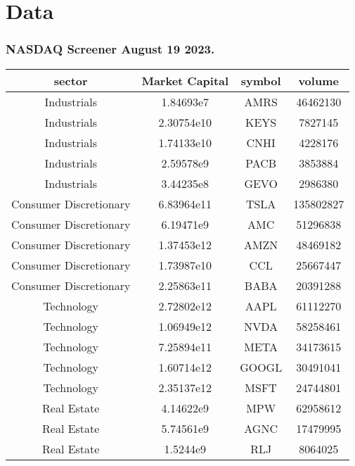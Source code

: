 \chapter{Data}

\subsection{NASDAQ Screener August 19 2023.} \label{sec::AppendixNasdaqScreener}

\begin{table}[ht!]
    \centering
    \begin{tabular}{|c|c|c|c|} \hline
    sector                 &   Market Capital  &   symbol &   volume \\\hline
 Industrials            &   1.84693e7  &   AMRS   &    46462130\\
 Industrials            &   2.30754e10 &   KEYS   &     7827145\\
 Industrials            &   1.74133e10 &   CNHI   &     4228176\\
 Industrials            &   2.59578e9  &   PACB   &     3853884\\
 Industrials            &   3.44235e8  &   GEVO   &     2986380\\
 Consumer Discretionary &   6.83964e11 &   TSLA   &   135802827\\
 Consumer Discretionary &   6.19471e9  &   AMC    &    51296838\\
 Consumer Discretionary &   1.37453e12 &   AMZN   &    48469182\\
 Consumer Discretionary &   1.73987e10 &   CCL    &    25667447\\
 Consumer Discretionary &   2.25863e11 &   BABA   &    20391288\\
 Technology             &   2.72802e12 &   AAPL   &    61112270\\
 Technology             &   1.06949e12 &   NVDA   &    58258461\\
 Technology             &   7.25894e11 &   META   &    34173615\\
 Technology             &   1.60714e12 &   GOOGL  &    30491041\\
 Technology             &   2.35137e12 &   MSFT   &    24744801\\
 Real Estate            &   4.14622e9  &   MPW    &    62958612\\
 Real Estate            &   5.74561e9  &   AGNC   &    17479995\\
 Real Estate            &   1.5244e9   &   RLJ    &     8064025\\

\end{tabular}
\end{table}
